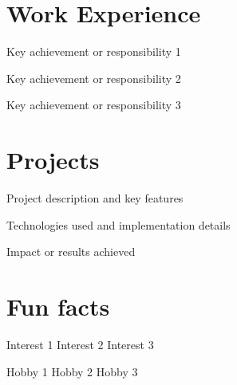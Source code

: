 \documentclass[]{hanisntsolo-resume}
\begin{document}
\begin{minipage}[t]{0.66\textwidth}


\section{Work Experience}
\vspace{\topsep}
\begin{tightemize}
\item Key achievement or responsibility 1
\item Key achievement or responsibility 2
\item Key achievement or responsibility 3
\end{tightemize}

\sectionsep


\section{Projects}
\begin{tightemize}
\item Project description and key features
\item Technologies used and implementation details
\item Impact or results achieved
\end{tightemize}

\sectionsep


\section{Fun facts}
Interest 1 \textbullet{} Interest 2 \textbullet{} Interest 3

Hobby 1 \textbullet{} Hobby 2 \textbullet{} Hobby 3

\end{minipage}
\end{document}
